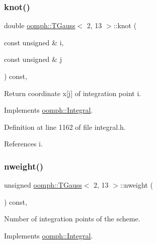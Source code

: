 \subsubsection{\texorpdfstring{knot()}{knot()}}
{\footnotesize\ttfamily double \hyperlink{classoomph_1_1TGauss}{oomph\+::\+T\+Gauss}$<$ 2, 13 $>$\+::knot (\begin{DoxyParamCaption}\item[{const unsigned \&}]{i,  }\item[{const unsigned \&}]{j }\end{DoxyParamCaption}) const\hspace{0.3cm}{\ttfamily [inline]}, {\ttfamily [virtual]}}



Return coordinate x\mbox{[}j\mbox{]} of integration point i. 



Implements \hyperlink{classoomph_1_1Integral_a1a2122f99a87c18649bafdd9ed739758}{oomph\+::\+Integral}.



Definition at line 1162 of file integral.\+h.



References i.

\mbox{\label{classoomph_1_1TGauss_3_012_00_0113_01_4_a720a71690b9b39eef2f62fe104ed5cf7}} 
\subsubsection{\texorpdfstring{nweight()}{nweight()}}
{\footnotesize\ttfamily unsigned \hyperlink{classoomph_1_1TGauss}{oomph\+::\+T\+Gauss}$<$ 2, 13 $>$\+::nweight (\begin{DoxyParamCaption}{ }\end{DoxyParamCaption}) const\hspace{0.3cm}{\ttfamily [inline]}, {\ttfamily [virtual]}}



Number of integration points of the scheme. 



Implements \hyperlink{classoomph_1_1Integral_a1a270de9d99a1fcf1d25a6c1017f65fa}{oomph\+::\+Integral}.



